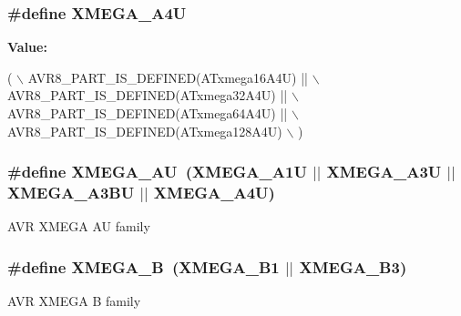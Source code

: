 \subsubsection[{X\+M\+E\+G\+A\+\_\+\+A4\+U}]{\setlength{\rightskip}{0pt plus 5cm}\#define X\+M\+E\+G\+A\+\_\+\+A4\+U}\label{group__xmega__part__macros__group_ga7625edcdd219df905c870d73c1689da6}
{\bfseries Value\+:}
\begin{DoxyCode}
( \(\backslash\)
        AVR8\_PART\_IS\_DEFINED(ATxmega16A4U)  || \(\backslash\)
        AVR8\_PART\_IS\_DEFINED(ATxmega32A4U)  || \(\backslash\)
        AVR8\_PART\_IS\_DEFINED(ATxmega64A4U)  || \(\backslash\)
        AVR8\_PART\_IS\_DEFINED(ATxmega128A4U) \(\backslash\)
        )
\end{DoxyCode}
\hypertarget{group__xmega__part__macros__group_ga55210f3805902072fce76647b50fa177}{}
\subsubsection[{X\+M\+E\+G\+A\+\_\+\+A\+U}]{\setlength{\rightskip}{0pt plus 5cm}\#define X\+M\+E\+G\+A\+\_\+\+A\+U~(X\+M\+E\+G\+A\+\_\+\+A1\+U $\vert$$\vert$ X\+M\+E\+G\+A\+\_\+\+A3\+U $\vert$$\vert$ X\+M\+E\+G\+A\+\_\+\+A3\+B\+U $\vert$$\vert$ X\+M\+E\+G\+A\+\_\+\+A4\+U)}\label{group__xmega__part__macros__group_ga55210f3805902072fce76647b50fa177}
A\+V\+R X\+M\+E\+G\+A A\+U family \hypertarget{group__xmega__part__macros__group_ga62f2c1c93640237425cb64186ddce219}{}
\subsubsection[{X\+M\+E\+G\+A\+\_\+\+B}]{\setlength{\rightskip}{0pt plus 5cm}\#define X\+M\+E\+G\+A\+\_\+\+B~(X\+M\+E\+G\+A\+\_\+\+B1 $\vert$$\vert$ X\+M\+E\+G\+A\+\_\+\+B3)}\label{group__xmega__part__macros__group_ga62f2c1c93640237425cb64186ddce219}
A\+V\+R X\+M\+E\+G\+A B family \hypertarget{group__xmega__part__macros__group_gaa2fd55860a1bbc05c6d0d384e7476596}{}

